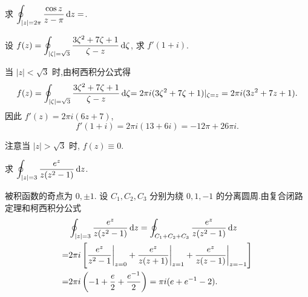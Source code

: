 \begin{exercise}
	求 $\displaystyle\oint_{|z|=2\pi}\frac{\cos z}{z-\pi}\,\mathrm{d} z=$.
\end{exercise}

\begin{example}
	设 $f(z)=\displaystyle\oint_{|\zeta|=\sqrt3}\frac{3\zeta^2+7\zeta+1}{\zeta-z}\,\mathrm{d} \zeta$, 求 $f'(1+i)$.
\end{example}

\begin{solution}
	当 $|z|<\sqrt3$ 时,由柯西积分公式得
	\[
		f(z)=\oint_{|\zeta|=\sqrt3}\frac{3\zeta^2+7\zeta+1}{\zeta-z}\,\mathrm{d} \zeta
		{=2\pi i(3\zeta^2+7\zeta+1)|_{\zeta=z}=2\pi i(3z^2+7z+1).}
	\]
	{因此 $f'(z)=2\pi i(6z+7)$,
		\[f'(1+i)=2\pi i(13+6i)=-12\pi+26\pi i.\]}
\end{solution}
注意当 $|z|>\sqrt3$ 时, $f(z)\equiv0$.

\begin{example}
	求 $\displaystyle\oint_{|z|=3}\frac{e^z}{z(z^2-1)}\,\mathrm{d} z$.
\end{example}

\begin{solution}
	被积函数的奇点为 $0,\pm1$.
	设 $C_1,C_2,C_3$ 分别为绕 $0,1,-1$ 的分离圆周.由复合闭路定理和柯西积分公式
	\begin{align*}
		&\oint_{|z|=3}\frac{e^z}{z(z^2-1)}\,\mathrm{d} z
		 =\oint_{C_1+C_2+C_3}\frac{e^z}{z(z^2-1)}\,\mathrm{d} z\\
		=&2\pi i\left[\frac{e^z}{z^2-1}\bigg|_{z=0}+\frac{e^z}{z(z+1)}\bigg|_{z=1}+\frac{e^z}{z(z-1)}\bigg|_{z=-1}\right]\\
		=&2\pi i\left(-1+\frac e2+\frac{e^{-1}}2\right)=\pi i(e+e^{-1}-2).
	\end{align*}
	\begin{center}
	\end{center}
\end{solution}

